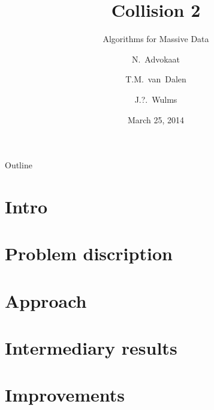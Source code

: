 \documentclass[dutch]{beamer}
\title{Collision 2}
\subtitle{Algorithms for Massive Data}
\author[Team GPU 2]{
	N.~Advokaat
	\and
	T.M.~van~Dalen
	\and
	J.?.~Wulms
}
\institute[TU/e]{
	Mathematics and Computer Science\\
	Eindhoven University of Technology
}
\date{March 25, 2014}
\begin{document}
	\begin{frame}
		\titlepage
	\end{frame}

	\begin{frame}{Outline}
		\tableofcontents
	\end{frame}

	\section{Intro}
		

	\section{Problem discription}
		

	\section{Approach}
		

	\section{Intermediary results}
		

	\section{Improvements}
		
\end{document}
